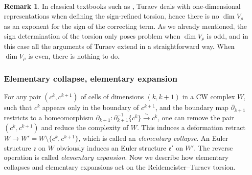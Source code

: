 \documentclass[JEP,XML,SOM,Unicode,NoFloatCountersInSection,published]{cedram}
\theoremstyle{plain}
\theoremstyle{definition}
\newtheorem{rmrk}[thm]{Remark}
\theoremstyle{remark}
\numberwithin{equation}{section}
\begin{document}
\begin{rmrk}
In classical textbooks such as \cite{Turaev_book, Turaev_tors}, Turaev deals with one-dimensional representations when defining the sign-refined torsion, hence there is no $\dim V_\rho$ as an exponent for the sign of the correcting term. As we already mentioned, the sign determination of the torsion only poses problem when $\dim V_\rho$ is odd, and in this case all the arguments of Turaev extend in a straightforward way. When $\dim V_\rho$ is even, there is nothing to do.
\end{rmrk}

\subsubsection{Elementary collapse, elementary expansion}

For any pair $(c^k, c^{k+1})$ of cells of dimensions $(k,k+1)$ in a CW complex $W$, such that $c^k$ appears only in the boundary of $c^{k+1}$, and the boundary map $\partial_{k+1}$ restricts to a homeomorphism \hbox{$\partial_{k+1} \!\colon\! \partial_{k+1}^{-1}\{c^k\} \!\xrightarrow{\sim}\!c^k$}, one can remove the pair $(c^k, c^{k+1})$ and reduce the complexity of $W$. This induces a deformation retract $W \to W' = W \setminus \{c^k, c^{k+1}\}$, which is called an \emph{elementary collapse}. An Euler structure $\mathfrak e$ on $W$ obviously induces an Euler structure $\mathfrak e'$ on $W'$. The reverse operation is called \emph{elementary expansion}.
Now we describe how elementary collapses and elementary expansions act on the Reidemeister--Turaev torsion.
\end{document}
